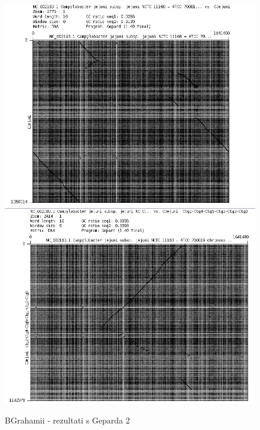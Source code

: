 \begin{figure}[H]
    \centering
    \includegraphics[scale=0.5]{img/Grah10.png}
    \includegraphics[scale=0.5]{img/Grah1.png}
    \caption{BGrahamii - rezultati s Geparda 2}
    \label{fig:grahmi2}
\end{figure}

